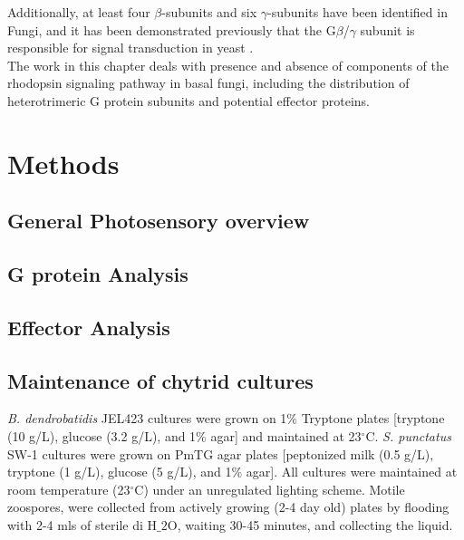 \indent Additionally, at least four $\beta$-subunits and six $\gamma$-subunits have been identified \cite{Hepler1992} in Fungi, and it has been demonstrated previously that the G$\beta$/$\gamma$ subunit is responsible for signal transduction in yeast \cite{Bolker1998}.\\
\indent The work in this chapter deals with presence and absence of components of the rhodopsin signaling pathway in basal fungi, including the distribution of heterotrimeric G protein subunits and potential effector proteins.\\
\section{Methods}
\subsection*{General Photosensory overview}
\subsection*{G protein Analysis}
\subsection*{Effector Analysis}
\subsection*{Maintenance of chytrid cultures}
\textit{B. dendrobatidis} JEL423 cultures were grown on 1\% Tryptone plates [tryptone (10 g/L), glucose (3.2 g/L), and 1\% agar] and maintained at 23$^{\circ}$C. \textit{S. punctatus} SW-1 cultures were grown on PmTG agar plates [peptonized milk (0.5 g/L), tryptone (1 g/L), glucose (5 g/L), and 1\% agar]. All cultures were maintained at room temperature (23$^{\circ}$C) under an unregulated lighting scheme. Motile zoospores, were collected from actively growing (2-4 day old) plates by flooding with 2-4 mls of sterile di H$\_{2}$O, waiting 30-45 minutes, and collecting the liquid. \\
